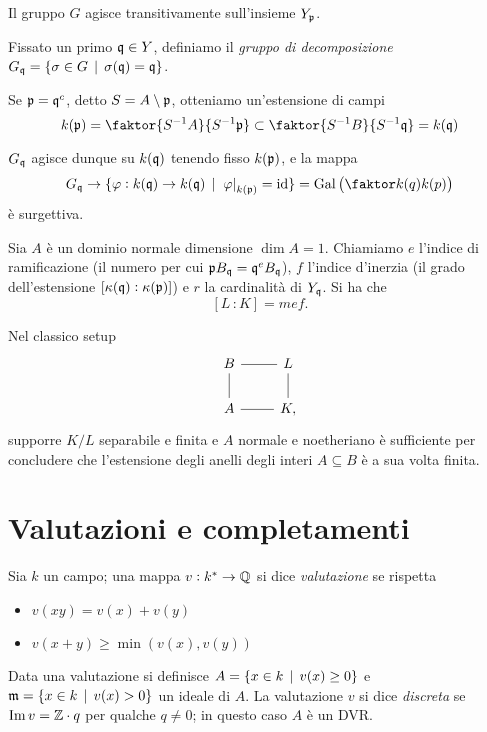 \begin{theorem}
    Il gruppo $G$ agisce transitivamente sull'insieme $Y_{\mathfrak{p}}$.
\end{theorem}

\begin{definition}
    Fissato un primo $\mathfrak{q}\in Y$, definiamo il \emph{gruppo di decomposizione} $G_{\mathfrak{q}}=\{ \sigma\in G \operatorname{\; |\;} \sigma(\mathfrak{q})=\mathfrak{q} \}$.
\end{definition}

\begin{definition}
	Se $\mathfrak{p}=\mathfrak{q}^c$, detto $S=A\setminus\mathfrak{p}$, otteniamo un'estensione di campi $$ k(\pf)=\faktor{S^{-1}A}{S^{-1}\pf} \subset \faktor{S^{-1}B}{S^{-1}\qf} =k(\qf) $$
\end{definition}

\begin{proposition}
    $G_{\mathfrak{q}}$ agisce dunque su $k(\mathfrak{q})$ tenendo fisso $k(\mathfrak{p})$, e la mappa $$ G_\qf\to\{ \varphi:k(\qf)\to k(\qf) \st \rest{\varphi}{k(\pf)}=\id \} = \Gal{k(q)}{k(p)} $$ è surgettiva.
\end{proposition}

\begin{theorem}
	Sia $ A $ è un dominio normale dimensione $ \dim A = 1 $. Chiamiamo $ e $ l'indice di ramificazione (il numero per cui $ \mathfrak{p} B_{\mathfrak{q}} = \mathfrak{q}^e B_{\mathfrak{q}} $), $ f $ l'indice d'inerzia (il grado dell'estensione $ [\kappa(\mathfrak{q}):\kappa(\mathfrak{p}) ]$) e $ r $ la cardinalità di $ Y_{\mathfrak{q}} $. Si ha che
	\[ [L\,\colon K] = mef. \]
\end{theorem}

\begin{theorem}
	Nel classico setup
	\[ \begin{tikzcd}
	B \rar[dash]\dar[dash] & L \dar[dash] \\
	A \rar[dash] & K,
	\end{tikzcd} \]
	supporre $ K/L $ separabile e finita e $ A $ normale e noetheriano è sufficiente per concludere che l'estensione degli anelli degli interi $ A \subseteq B $ è a sua volta finita.
\end{theorem}

\section{Valutazioni e completamenti}

\begin{definition}
    Sia $k$ un campo; una mappa $v: k^\ast\to\mathbb{Q}$ si dice \emph{valutazione} se rispetta
    \begin{itemize}
        \item $v(xy)=v(x)+v(y)$
        \item $v(x+y)\ge\min(v(x),v(y))$
    \end{itemize}
    Data una valutazione si definisce $A=\{x\in k \operatorname{\; |\;} v(x)\ge0 \}$ e $\mathfrak{m}=\{ x\in k\operatorname{\; |\;} v(x)>0 \}$ un ideale di $A$. La valutazione $v$ si dice \emph{discreta} se $\operatorname{Im} v=\mathbb{Z}\cdot q$ per qualche $q\neq0$; in questo caso $A$ è un DVR.
\end{definition}

